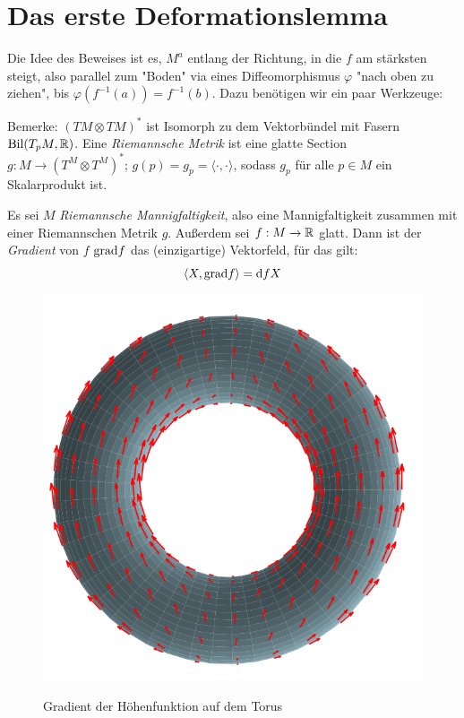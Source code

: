 \section{Das erste Deformationslemma}

Die Idee des Beweises ist es, $M^a$ entlang der Richtung, in die $f$ am stärksten
steigt, also parallel zum "Boden" via eines Diffeomorphismus $\varphi$ "nach oben 
zu ziehen", bis $\varphi(f^{-1}(a)) = f^{-1}(b)$. Dazu benötigen wir ein paar 
Werkzeuge:

\begin{definition}
    Bemerke: $( TM \otimes TM )^*$ ist Isomorph zu dem Vektorbündel mit Fasern 
    $\operatorname{Bil}(T_pM, { \mathbb R })$. Eine \textit{Riemannsche Metrik} ist eine glatte
    Section $g: M \to (T^M \otimes T^M)^*$; $g(p) = g_p = \langle \cdot, \cdot \rangle$, 
    sodass $g_p$ für alle $p \in M$ ein Skalarprodukt ist.
\end{definition}

\begin{definition}[Gradient]
    Es sei $M$ \textit{Riemannsche Mannigfaltigkeit}, also eine Mannigfaltigkeit
    zusammen mit einer Riemannschen Metrik $g$. Außerdem sei $f: M \to { \mathbb R }$ glatt.
    Dann ist der \textit{Gradient} von $f$ ${ \operatorname{grad} } f$ das (einzigartige) 
    Vektorfeld, für das gilt:
    \[ \langle X, { \operatorname{grad} } f \rangle = { \operatorname{d} } fX \]
\end{definition}

\begin{figure}[H]
    \centering
    \includegraphics[width=0.7\linewidth]{resources/Me-Diagram4-gradient-of-hightmapping.png}
    \label{fig:me-diagram4}
    \caption{Gradient der Höhenfunktion auf dem Torus}
\end{figure}

